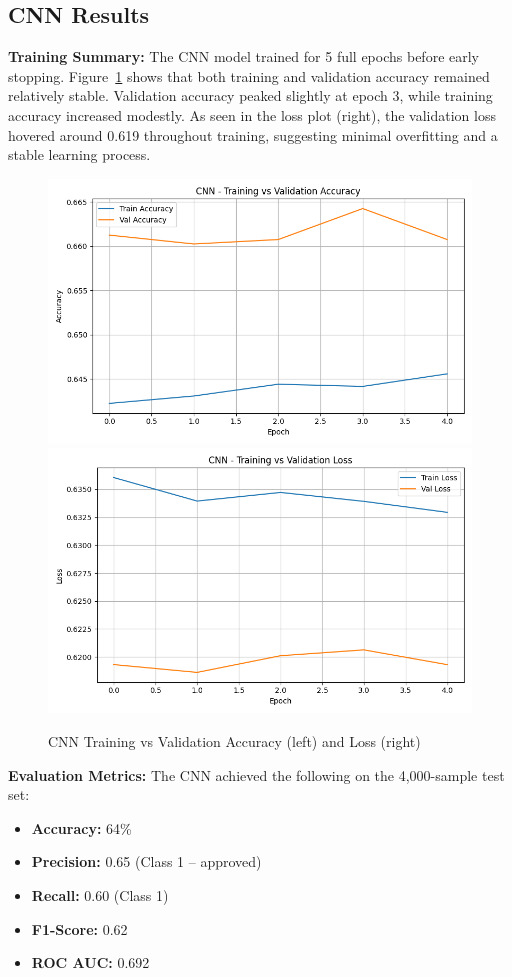 \newpage
\subsection{CNN Results}

\textbf{Training Summary:}  
The CNN model trained for 5 full epochs before early stopping. Figure~\ref{fig:cnn_acc_loss} shows that both training and validation accuracy remained relatively stable. Validation accuracy peaked slightly at epoch 3, while training accuracy increased modestly. As seen in the loss plot (right), the validation loss hovered around 0.619 throughout training, suggesting minimal overfitting and a stable learning process.

\begin{figure}[H]
    \centering
    \includegraphics[width=0.47\linewidth]{figures/cnn_accuracy.png}
    \includegraphics[width=0.47\linewidth]{figures/cnn_loss.png}
    \caption{CNN Training vs Validation Accuracy (left) and Loss (right)}
    \label{fig:cnn_acc_loss}
\end{figure}

\textbf{Evaluation Metrics:}  
The CNN achieved the following on the 4,000-sample test set:

\begin{itemize}
    \item \textbf{Accuracy:} 64\%
    \item \textbf{Precision:} 0.65 (Class 1 – approved)
    \item \textbf{Recall:} 0.60 (Class 1)
    \item \textbf{F1-Score:} 0.62
    \item \textbf{ROC AUC:} 0.692
\end{itemize}


